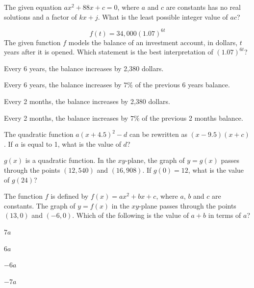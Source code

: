 \vfill
\clearpage
\noindent\begin{minipage}{\linewidth}
\par\smallskip
The given equation $ax^2+88x+c=0$, where $a$ and $c$ are constants has no real solutions and a factor of $kx+j$. What is the least possible integer value of $ac$?
\end{minipage}
\vfill
\noindent\begin{minipage}{\linewidth}
\par\smallskip
$$f(t)=34{,}000(1.07)^{6t}$$ The given function $f$ models the balance of an investment account, in dollars, $t$ years after it is opened. Which statement is the best interpretation of $(1.07)^{6t}$?
\begin{satchoices}
  \item[A)] Every 6 years, the balance increases by 2,380 dollars.
  \item[B)] Every 6 years, the balance increases by $7\%$ of the previous 6 years balance.
  \item[C)] Every 2 months, the balance increases by 2,380 dollars.
  \item[D)] Every 2 months, the balance increases by $7\%$ of the previous 2 months balance.
\end{satchoices}
\end{minipage}
\vfill
\noindent\begin{minipage}{\linewidth}
\par\smallskip
The quadratic function $a(x+4.5)^2-d$ can be rewritten as $(x-9.5)(x+c)$. If $a$ is equal to 1, what is the value of $d$?
\end{minipage}
\vfill
\clearpage
\noindent\begin{minipage}{\linewidth}
\par\smallskip
$g(x)$ is a quadratic function. In the $xy$-plane, the graph of $y=g(x)$ passes through the points $(12,540)$ and $(16,908)$. If $g(0)=12$, what is the value of $g(24)$?
\end{minipage}
\vfill
\noindent\begin{minipage}{\linewidth}
\par\smallskip
The function $f$ is defined by $f(x)=ax^2+bx+c$, where $a$, $b$ and $c$ are constants. The graph of $y=f(x)$ in the $xy$-plane passes through the points $(13,0)$ and $(-6,0)$. Which of the following is the value of $a+b$ in terms of $a$?
\begin{satchoices}
  \item[A)] $7a$
  \item[B)] $6a$
  \item[C)] $-6a$
  \item[D)] $-7a$
\end{satchoices}
\end{minipage}

